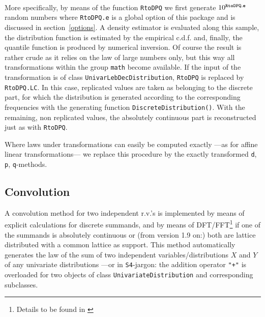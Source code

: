\documentclass[11pt]{article}
\newcommand{\code}[1]{{\tt #1}}
\begin{document}
\\
More specifically, by means of the function 
\code{RtoDPQ} we first generate $10^{\footnotesize\tt RtoDPQ.e}$
random numbers where \code{RtoDPQ.e} is a global option of this package and is 
discussed in section~{\ref{options}}. %
A density estimator is evaluated along this sample, the distribution function is 
estimated by the empirical c.d.f. and, finally, the quantile function is 
produced by numerical inversion.
Of course the result is rather crude as it relies on the law of large numbers 
only, but this way all transformations within the group \code{math} become 
available.
If the input of the transformation is of class \code{UnivarLebDecDistribution},
\code{RtoDPQ} is replaced by \code{RtoDPQ.LC}. In this case, replicated values
are taken as belonging to the discrete part, for which the distribution is 
generated according to the corresponding frequencies with the generating
function \code{DiscreteDistribution()}. With the remaining, non replicated
values, the absolutely continuous part is reconstructed just as with \code{RtoDPQ}.

Where laws under transformations can easily be computed exactly ---as for affine
linear transformations--- we replace this procedure by the exactly transformed
\code{d}, \code{p}, \code{q}-methods.
%
\subsection{Convolution}
%
A convolution method for two independent r.v.'s is implemented by means 
of explicit calculations for discrete summands, and by means of 
DFT/FFT\footnote{Details to be found in \cite{K:R:S:04}} if one of the summands is 
absolutely continuous or (from version 1.9 on:) both are lattice distributed 
with a common lattice as support.
This method automatically generates the law of the sum of two independent 
variables/distributions $X$ and $Y$ of any univariate distributions ---or 
in {\tt S4}-jargon: the addition operator \code{"+"} is overloaded for two 
objects of class \code{UnivariateDistribution} and corresponding subclasses.
%
\end{document}
